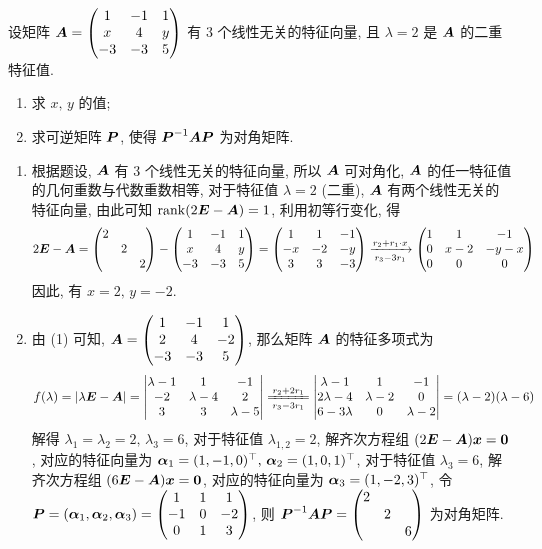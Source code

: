 \begin{example}
    设矩阵 $\vb*{A}=\mqty(1& -1& 1\\ x& 4& y\\ -3& -3& 5)$ 有 $3$ 个线性无关的特征向量, 且 $\lambda=2$ 是 $\vb*{A}$ 的二重特征值.
    \begin{enumerate}[label=(\arabic{*})]
        \item 求 $x\text{, }y$ 的值;
        \item 求可逆矩阵 $\vb*{P}$, 使得 $\vb*{P}^{-1}\vb*{AP}$ 为对角矩阵.
    \end{enumerate}
\end{example}
\begin{solution}
    \begin{enumerate}[label=(\arabic{*})]
        \item 根据题设, $\vb*{A}$ 有 3 个线性无关的特征向量, 所以 $\vb*{A}$ 可对角化, $\vb*{A}$ 的任一特征值的几何重数与代数重数相等, 对于特征值 $\lambda=2$ (二重), $\vb*{A}$
              有两个线性无关的特征向量, 由此可知 $\rank(2\vb*{E}-\vb*{A})=1$, 利用初等行变化, 得
              $$2\vb*{E}-\vb*{A}=\mqty(\dmat{2,2,2})-\mqty(1 &-1 &1\\ x &4 &y\\ -3 &-3 &5)=\mqty(1 &1 &-1\\ -x &-2 &-y\\ 3 &3 &-3)\xrightarrow[r_3-3r_1]{r_2+r_1\cdot x}\mqty(1 &1 &-1\\ 0 &x-2 &-y-x\\ 0 &0 &0)$$
              因此, 有 $x=2\text{, }y=-2.$
        \item 由 (1) 可知, $\vb*{A}=\mqty(1 &-1 &1\\ 2 &4 &-2\\ -3 &-3 &5)$, 那么矩阵 $\vb*{A}$ 的特征多项式为
              $$f(\lambda)=|\lambda\vb*{E}-\vb*{A}|=\mqty|\lambda-1 &1 &-1\\ -2 &\lambda-4 &2\\ 3 &3 &\lambda-5|\xlongequal[r_3-3r_1]{r_2+2r_1}\mqty|\lambda-1 &1 &-1\\ 2\lambda-4 &\lambda-2 &0\\ 6-3\lambda &0 &\lambda-2|=(\lambda-2)(\lambda-6)$$
              解得 $\lambda_1=\lambda_2=2\text{, }\lambda_3=6$, 对于特征值 $\lambda_{1,2}=2$, 解齐次方程组 $(2\vb*{E}-\vb*{A})\vb*{x}=\vb*{0}$, 对应的特征向量为
              $\vb*{\alpha}_1=(1,-1,0)^\top\text{, }\vb*{\alpha}_2=(1,0,1)^\top$,
              对于特征值 $\lambda_{3}=6$, 解齐次方程组 $(6\vb*{E}-\vb*{A})\vb*{x}=\vb*{0}$, 对应的特征向量为
              $\vb*{\alpha}_3=(1,-2,3)^\top$,
              令 $\vb*{P}=(\vb*{\alpha}_1,\vb*{\alpha}_2,\vb*{\alpha}_3)=\mqty(1 &1 &1\\ -1 &0 &-2\\ 0 &1 &3)$, 则 $\vb*{P}^{-1}\vb*{AP}=\mqty(\dmat{2,2,6})$ 为对角矩阵.
    \end{enumerate}
\end{solution}

